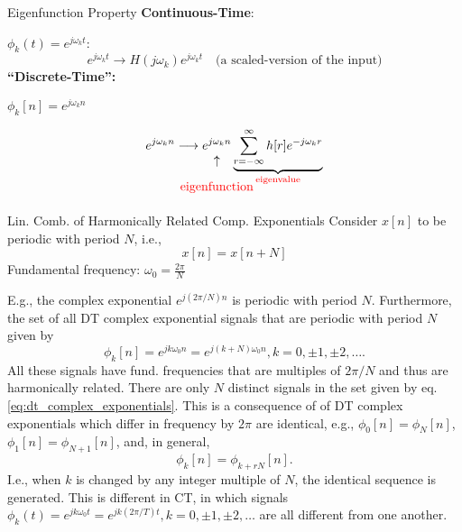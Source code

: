 \begin{frame}{Eigenfunction Property}
    \textbf{Continuous-Time}:\par
    $\phi_k(t) = e^{j\omega_k t}$:
    \begin{equation*}
        e^{j\omega_k t} \longrightarrow H(j\omega_k) e^{j\omega_k t} \quad \text{(a scaled-version of the input)}
    \end{equation*}
    \textbf{``Discrete-Time'':}\pause
    {
        $\phi_k[n] = e^{j\omega_k n}$\par
        \begin{equation*}
            e^{j\omega_k n} \longrightarrow
            \underset{\mathclap{\tikz \node {$\uparrow$} node [below=3ex, text=red] {eigenfunction};}}{
            e^{j\omega_k n}
            }
            \underbrace{
            \sum_{r=-\infty}^{\infty} h[r]e^{-j\omega_k r}
            }_{\textcolor{red}{\text{eigenvalue}}}
        \end{equation*}
    }
\end{frame}


\begin{frame}[allowframebreaks]{Lin. Comb. of Harmonically Related Comp. Exponentials}
       Consider $x[n]$ to be periodic with period $N$, i.e.,
        \begin{equation*}
            x[n] = x[n+N]
        \end{equation*}
        Fundamental frequency: $\omega_0 = \frac{2\pi}{N}$\par
        E.g.,  the complex exponential $e^{j (2\pi/N)n}$ is periodic with  period $N$. Furthermore, the set of all DT complex exponential signals that are periodic with period $N$ given by
        \begin{equation}
            \label{eq:dt_complex_exponentials}
            \phi_k[n] = e^{jk\omega_0n} = e^{j(k+N)\omega_0n}, k=0, \pm1, \pm2, \dots .
        \end{equation}
        All these signals have fund. frequencies that are multiples of $2\pi/N$ and thus are harmonically related. There are only $N$ distinct signals in the set given by eq. \ref{eq:dt_complex_exponentials}. This is a consequence of of DT complex exponentials which differ in frequency by $2\pi$ are identical, e.g., $\phi_0[n] =\phi_N[n] $, $\phi_1[n] =\phi_{N+1}[n] $, and, in general,
        \begin{equation*}
            \phi_k[n] =\phi_{k + rN}[n].
        \end{equation*}
        I.e., when $k$ is changed by any integer multiple of $N$, the identical sequence is generated.         %
        This is different in CT, in which signals
        $ \phi_k(t) = e^{jk\omega_0 t} = e^{jk(2\pi/T)t}, k = 0, \pm 1, \pm 2, \dots$
        are all different from one another.
\end{frame}


